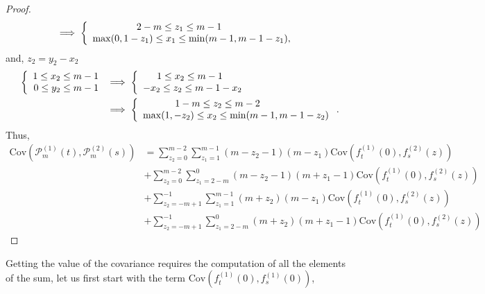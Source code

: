 \documentclass[12pt]{article}
\theoremstyle{Theorem}
\begin{document}
\begin{proof}
\begin{align*}
& \implies  \left\{
\begin{array}{rcl}
2 - m \leq z_1 \leq m-1 \hspace{2.5cm}  \\
\max(0, 1-z_1) \leq x_1 \leq \min(m-1 , m-1-z_1),
\end{array}\right.
\end{align*} 
and, $z_{2} = y_{2}-x_{2}$
\begin{align*} 
\left\{
\begin{array}{rcl}
1 \leq x_2 \leq m-1 \\
0 \leq y_2 \leq m-1 
\end{array}\right.& \implies  \left\{ \begin{array}{rcl}
1 \leq x_2 \leq m-1 \hspace{0.7cm} \\
-x_2 \leq z_2 \leq m- 1 - x_2
\end{array}\right. \\
& \implies  \left\{
\begin{array}{rcl}
1 - m \leq z_2 \leq m-2 \hspace{2.5cm}  \\
\max(1, -z_2) \leq x_2 \leq \min(m-1 , m-1-z_2)
\end{array}\right..
\end{align*} 
Thus, 
\begin{align*}
\text{Cov}\left(\mathcal{P}_{m}^{\scriptscriptstyle (1)}(t),\mathcal{P}_{m}^{\scriptscriptstyle (2)}(s) \right) & = \sum_{z_2 = 0}^{m-2} \sum_{z_1=1}^{m-1}\left(m-z_2-1\right)\left(m-z_1\right)\text{Cov}\left(f_{t}^{\scriptscriptstyle (1)}(0), f_{s}^{ \scriptscriptstyle (2)}(z) \right)\\
& + \sum_{z_2 = 0}^{m-2} \sum_{z_1=2-m}^{\scriptscriptstyle 0}\left(m-z_2-1\right)\left(m+z_1-1\right)\text{Cov}\left(f_{t}^{\scriptscriptstyle (1)}(0), f_{s}^{ \scriptscriptstyle (2)}(z) \right)\\
& + \sum_{z_2 = -m+1}^{-1} \sum_{z_1=1}^{m-1}\left(m+z_2\right)\left(m-z_1\right)\text{Cov}\left(f_{t}^{\scriptscriptstyle (1)}(0), f_{s}^{ \scriptscriptstyle (2)}(z) \right)\\
& + \sum_{z_2 = -m+1}^{-1} \sum_{z_1=2-m}^{\scriptscriptstyle 0}\left(m+z_2\right)\left(m+z_1-1\right)\text{Cov}\left(f_{t}^{\scriptscriptstyle (1)}(0), f_{s}^{ \scriptscriptstyle (2)}(z) \right) 
\end{align*}
\end{proof}
Getting the value of the covariance requires the computation of all the elements of the sum, let us first start with the term $\text{Cov}\left(f_{t}^{\scriptscriptstyle (1)}(0), f_{s}^{\scriptscriptstyle (1)}(0)\right)$,
\end{document}
